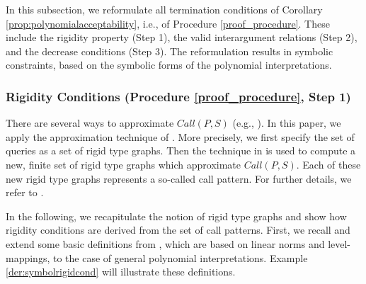 \documentclass[envcountsame]{tlp}
\newcounter{ex:der-lastsymconsctr}
\begin{document}
In this subsection, we reformulate all termination conditions of Corollary
\ref{prop:polynomialacceptability}, i.e., of Procedure \ref{proof_procedure}. 
These include the rigidity property (Step 1),
the valid interargument relations (Step 2), and the
decrease conditions (Step 3). The reformulation results in
symbolic constraints, based on the
symbolic forms of the polynomial interpretations.

 
\subsubsection{Rigidity Conditions (Procedure \ref{proof_procedure}, Step 1)}\label{Rigidity Conditions}\hspace*{\fill}

\vspace*{.2cm}



\noindent
There are several ways to approximate $\mathit{Call}(P,S)$ (e.g.,
\cite{Bruynoogheetal05,GallagherHB05,HeatonACK00,Janssensetal92}). 
In this paper, we apply the approximation technique
of \cite{GallagherHB05,Janssensetal92}. More precisely, we first
specify the set of queries as a set of rigid
type graphs. 
Then the technique in \cite{GallagherHB05,Janssensetal92} is used to 
compute a new, finite set of rigid type graphs which 
approximate
$\mathit{Call}(P,S)$. Each of these new rigid type graphs represents
 a so-called
call pattern.
For further details, we
refer to \cite{GallagherHB05,Janssensetal92}.  

In the following, we 
recapitulate the notion of rigid type graphs
and show how rigidity conditions are derived from the set of call patterns. First,
we recall and extend some basic definitions from 
\cite{Janssensetal92}, which are based on linear norms and
level-mappings, to the case of general polynomial
interpretations.  Example \ref{der:symbolrigidcond} will illustrate these definitions.
\end{document}
